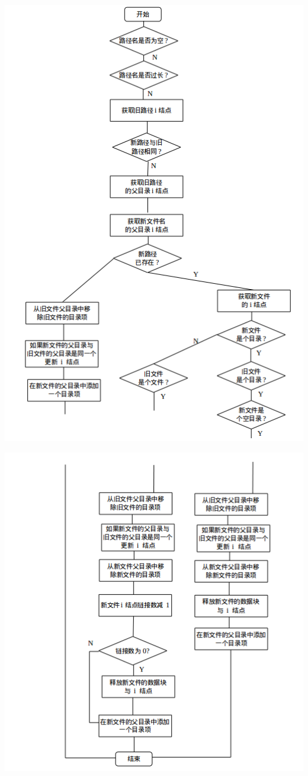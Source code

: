 \documentclass[nofonts, titlepage]{ctexart}
\begin{document}
\begin{itemize}
  \includegraphics[width=15cm]{./images/./rename_1.png}

  \includegraphics[width=15cm]{./images/./rename_2.png}
  \end{itemize}
\end{document}

